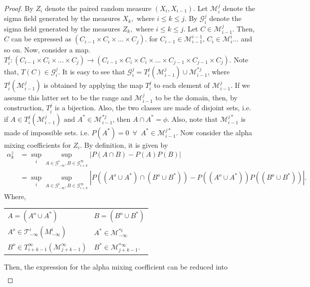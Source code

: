 \documentclass[11pt]{amsart}
\begin{document}
\begin{proof}
By $Z_i$ denote the paired random measure $(X_i,X_{i-1})$. Let $\mathcal{M}_i^j$ denote the sigma field generated by the measures $X_k, \text{ where } i\leq k\leq j$. By $\mathcal{G}_i^j$ denote the sigma field generated by the measures $Z_k, \text{ where } i\leq k\leq j$. Let $C\in \mathcal{M}_{i-1}^j$. Then, $C$ can be expressed as $(C_{i-1}\times C_i\times \dots \times C_j)$. for $C_{i-1}\in \mathcal{M}_{i-1}^{i-1}\text{, } C_i \in \mathcal{M}_i^i \dots$ and so on. Now, consider a map. $T_i^j : (C_{i-1}\times C_i\times \dots \times C_j)\xrightarrow{} (C_{i-1}\times C_i\times C_i \times \dots \times C_{j-1} \times C_{j-1} \times C_j)$. Note that, $T(C)\in \mathcal{G}_i^j$. It is easy to see that $\mathcal{G}_i^j = T_i^j(\mathcal{M}_{i-1}^j)\cup \mathcal{M}_{i-1}^{*j}$, where $T_i^j(\mathcal{M}_{i-1}^j)$ is obtained by applying the map $T_i^j$ to each element of $\mathcal{M}_{i-1}^j$. If we assume this latter set to be the range and $\mathcal{M}_{i-1}^j$ to be the domain, then, by construction, $T_i^j$ is a bijection. Also, the two classes are made of disjoint sets, i.e. if $A\in T_i^j(\mathcal{M}_{i-1}^j) \text{ and } A^*\in \mathcal{M}_{i-1}^{*j}$, then $A\cap A^*=\phi$. Also, note that $\mathcal{M}_{i-1}^{j*}$ is made of impossible sets. i.e. $P(A^*)=0 \enspace \forall\enspace A^* \in \mathcal{M}_{i-1}^{j*}$. Now consider the alpha mixing coefficients for $Z_i$. By definition, it is given by
\begin{align*}
  \alpha^z_k & = \underset{i}{\sup}\underset{A\in\mathcal{G}_{-\infty}^{i} ,B\in\mathcal{G}_{i+k}^{\infty}}{\sup}|P(A\cap B)-P(A)P(B)|\\
   & = \underset{i}{\sup}\underset{A\in\mathcal{G}_{-\infty}^{i} ,B\in\mathcal{G}_{i+k}^{\infty}}{\sup}|P((A^o\cup A^*)\cap (B^o\cup B^*))-P((A^o\cup A^*))P((B^o\cup B^*))|.
\end{align*}
%
Where,
%
\begin{center}
\begin{tabular}{l l}
$A=(A^o\cup A^*)$ & $B=(B^o\cup B^*)$ \\ 
$A^o \in \mathcal T_{-\infty}^i({M}_{-\infty}^{i})$ & $A^* \in \mathcal{M}_{-\infty}^{*i}$ \\  
$B^o \in T_{i+k-1}^{\infty}(\mathcal{M}_{j+k-1}^{\infty})$ & $B^* \in \mathcal{M}_{j+k-1}^{*\infty}.$    
\end{tabular}
\end{center}
Then, the expression for the alpha mixing coefficient can be reduced into
%
\begin{align*}

\end{align*}
\end{proof}
\end{document}
